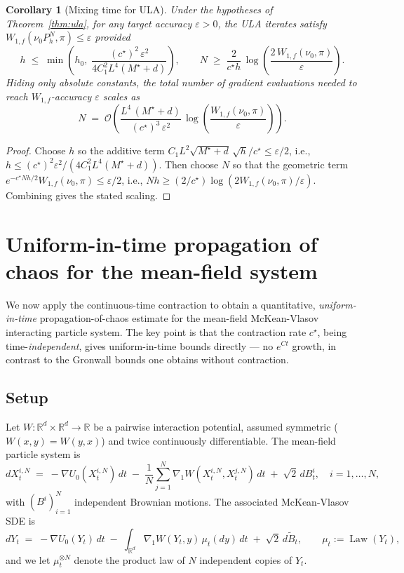 \documentclass[11pt]{article}
\newtheorem{corollary}[theorem]{Corollary}
\theoremstyle{definition}
\DeclareMathOperator{\Law}{Law}
\newcommand{\R}{\mathbb{R}}
\begin{document}
\begin{corollary}[Mixing time for ULA]\label{cor:mix}
Under the hypotheses of Theorem~\ref{thm:ula}, for any target accuracy $\varepsilon > 0$, the ULA iterates satisfy $W_{1,f}(\nu_0 P_h^N, \pi) \le \varepsilon$ provided
\[
h \;\le\; \min\!\left(h_0,\; \frac{(c^\star)^2\,\varepsilon^2}{4 C_1^2 L^4 (M^\star + d)}\right), \qquad N \;\ge\; \frac{2}{c^\star h}\,\log\!\left(\frac{2\,W_{1,f}(\nu_0, \pi)}{\varepsilon}\right).
\]
Hiding only absolute constants, the total number of gradient evaluations needed to reach $W_{1,f}$-accuracy $\varepsilon$ scales as
\[
N \;=\; \mathcal{O}\!\left(\frac{L^4\,(M^\star + d)}{(c^\star)^3\,\varepsilon^2}\,\log\!\left(\frac{W_{1,f}(\nu_0, \pi)}{\varepsilon}\right)\right).
\]
\end{corollary}

\begin{proof}
Choose $h$ so the additive term $C_1 L^2\sqrt{M^\star + d}\,\sqrt h/c^\star \le \varepsilon/2$, i.e., $h \le (c^\star)^2\varepsilon^2/(4 C_1^2 L^4 (M^\star + d))$. Then choose $N$ so that the geometric term $e^{-c^\star N h/2} W_{1,f}(\nu_0,\pi) \le \varepsilon/2$, i.e., $N h \ge (2/c^\star)\log(2 W_{1,f}(\nu_0,\pi)/\varepsilon)$. Combining gives the stated scaling.
\end{proof}

\section{Uniform-in-time propagation of chaos for the mean-field system}\label{sec:poc}

We now apply the continuous-time contraction to obtain a quantitative, \emph{uniform-in-time} propagation-of-chaos estimate for the mean-field McKean-Vlasov interacting particle system. The key point is that the contraction rate $c^\star$, being time-\emph{independent}, gives uniform-in-time bounds directly --- no $e^{Ct}$ growth, in contrast to the Gronwall bounds one obtains without contraction.

\subsection{Setup}

Let $W: \R^d \times \R^d \to \R$ be a pairwise interaction potential, assumed symmetric ($W(x,y) = W(y,x)$) and twice continuously differentiable. The mean-field particle system is
\begin{equation}\label{eq:particle}
dX^{i,N}_t \;=\; -\nabla U_0(X^{i,N}_t)\,dt \;-\; \frac{1}{N}\sum_{j=1}^N \nabla_1 W(X^{i,N}_t, X^{j,N}_t)\,dt \;+\; \sqrt 2\,dB^i_t, \quad i = 1,\dots, N,
\end{equation}
with $(B^i)_{i=1}^N$ independent Brownian motions. The associated McKean-Vlasov SDE is
\begin{equation}\label{eq:mckean}
dY_t \;=\; -\nabla U_0(Y_t)\,dt \;-\; \int_{\R^d}\nabla_1 W(Y_t, y)\, \mu_t(dy)\,dt \;+\; \sqrt 2\,d\tilde B_t, \qquad \mu_t := \Law(Y_t),
\end{equation}
and we let $\mu_t^{\otimes N}$ denote the product law of $N$ independent copies of $Y_t$.
\end{document}
